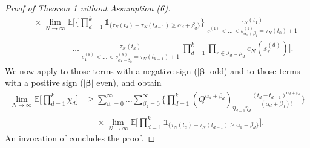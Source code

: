 \documentclass[a4paper,11pt]{article}
\theoremstyle{definition}
\newcommand{\E}{\mathbb{E}}
\newcommand{\1}{\mathds{1}}
\newcommand{\osum}{\mathop{\sum\nolimits^{\phantom{}_{\star}}}\limits}
\begin{document}
\begin{proof}[Proof of Theorem 1 without Assumption (6)]
\begin{align*}
&\phantom{\geq} \times \lim_{ N \rightarrow \infty } \E\Bigg[ \Bigg\{ \prod_{ d = 1 }^k \mathds{ 1 }_{ \{ \tau_N( t_d ) - \tau_N( t_{ d - 1 } ) \geq \alpha_d + \beta_d \} } \Bigg\} \osum_{ s_1^{ ( 1 ) } < \ldots < s_{ \alpha_1 + \beta_1 }^{ ( 1 ) } = \tau_N( t_0 ) + 1 }^{ \tau_N( t_1 ) } \\
&\phantom{\geq \times \lim_{ N \rightarrow \infty } \E\Bigg[} \ldots \osum_{ s_1^{ ( k ) } < \ldots < s_{ \alpha_k + \beta_k }^{ ( k ) } = \tau_N( t_{ k - 1 } ) + 1 }^{ \tau_N( t_k ) } \prod_{ d = 1 }^k \prod_{ r \in \lambda_d \cup \mu_d } c_N( s_r^{ ( d ) } ) \Bigg].
\end{align*}
We now apply \cite[Eq (14)]{Koskela19} to those terms with a negative sign ($| \bm{ \beta } |$ odd) and \cite[Eq (15)]{Koskela19} to those terms with a positive sign ($| \bm{ \beta } |$ even), and obtain
\begin{align*}
\lim_{ N \rightarrow \infty } \E\Bigg[ \prod_{ d = 1 }^k \chi_d \Bigg] &\geq \sum_{ \beta_1 = 0 }^{ \infty } \ldots \sum_{ \beta_k = 0 }^{ \infty } \Bigg\{ \prod_{ d = 1 }^k ( Q^{ \alpha_d + \beta_d } )_{ \eta_{ d - 1 } \eta_d } \frac{ ( t_d - t_{ d - 1 } )^{ \alpha_d + \beta_d } }{ ( \alpha_d + \beta_d ) ! } \Bigg\} \\
&\phantom{\geq} \times \lim_{ N \rightarrow \infty } \E\Bigg[ \prod_{ d = 1 }^k \mathds{ 1 }_{ \{ \tau_N( t_d ) - \tau_N( t_{ d - 1 } ) \geq \alpha_d + \beta_d \} } \Bigg].
\end{align*}
An invocation of \cite[Eq (16)]{Koskela19} concludes the proof.
\end{proof}
  
\end{document}
